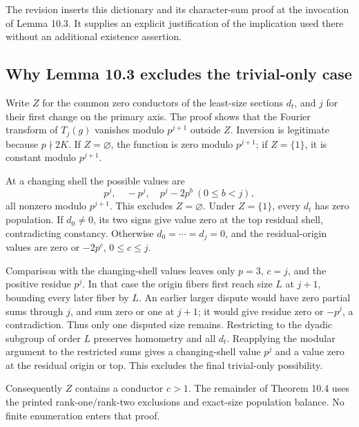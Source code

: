 \documentclass[11pt]{article}
\begin{document}
The revision inserts this dictionary and its character-sum proof at the
invocation of Lemma 10.3. It supplies an explicit justification of the
implication used there without an additional existence assertion.

\subsection*{Why Lemma 10.3 excludes the trivial-only case}
Write \(Z\) for the common zero conductors of the least-size sections
\(d_t\), and \(j\) for their first change on the primary axis.
The proof shows that the Fourier transform of \(T_j(g)\) vanishes
modulo \(p^{j+1}\) outside \(Z\). Inversion is legitimate because
\(p\nmid 2K\). If \(Z=\varnothing\), the function is zero modulo
\(p^{j+1}\); if \(Z=\{1\}\), it is constant modulo \(p^{j+1}\).

At a changing shell the possible values are
\[
p^j,\quad -p^j,\quad p^j-2p^b\ (0\le b<j),
\]
all nonzero modulo \(p^{j+1}\). This excludes \(Z=\varnothing\).
Under \(Z=\{1\}\), every \(d_t\) has zero population. If \(d_0\ne0\),
its two signs give value zero at the top residual shell, contradicting
constancy. Otherwise \(d_0=\cdots=d_j=0\), and the residual-origin
values are zero or \(-2p^c\), \(0\le c\le j\).

Comparison with the changing-shell values leaves only \(p=3\),
\(c=j\), and the positive residue \(p^j\). In that case the origin
fibers first reach size \(L\) at \(j+1\), bounding every later fiber
by \(L\). An earlier larger dispute would have zero partial sums
through \(j\), and sum zero or one at \(j+1\); it would give residue
zero or \(-p^j\), a contradiction. Thus only one disputed size remains.
Restricting to the dyadic subgroup of order \(L\) preserves homometry
and all \(d_t\). Reapplying the modular argument to the restricted sums
gives a changing-shell value \(p^j\) and a value zero at the residual
origin or top. This excludes the final trivial-only possibility.

Consequently \(Z\) contains a conductor \(c>1\). The remainder of
Theorem 10.4 uses the printed rank-one/rank-two exclusions and
exact-size population balance. No finite enumeration enters that proof.
\end{document}
